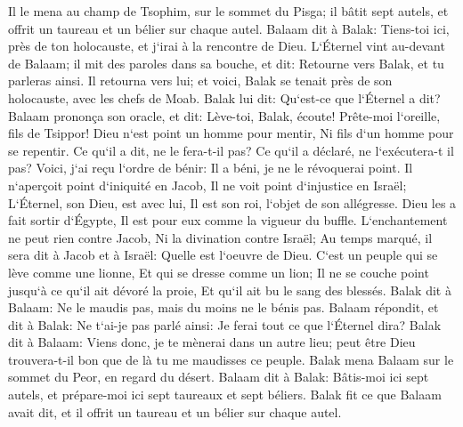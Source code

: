 \verse Il le mena au champ de Tsophim, sur le sommet du Pisga; il bâtit sept autels, et offrit un taureau et un bélier sur chaque autel. 
\verse Balaam dit à Balak: Tiens-toi ici, près de ton holocauste, et j`irai à la rencontre de Dieu. 
\verse L`Éternel vint au-devant de Balaam; il mit des paroles dans sa bouche, et dit: Retourne vers Balak, et tu parleras ainsi. 
\verse Il retourna vers lui; et voici, Balak se tenait près de son holocauste, avec les chefs de Moab. Balak lui dit: Qu`est-ce que l`Éternel a dit? 
\verse Balaam prononça son oracle, et dit: Lève-toi, Balak, écoute! Prête-moi l`oreille, fils de Tsippor! 
\verse Dieu n`est point un homme pour mentir, Ni fils d`un homme pour se repentir. Ce qu`il a dit, ne le fera-t-il pas? Ce qu`il a déclaré, ne l`exécutera-t il pas? 
\verse Voici, j`ai reçu l`ordre de bénir: Il a béni, je ne le révoquerai point. 
\verse Il n`aperçoit point d`iniquité en Jacob, Il ne voit point d`injustice en Israël; L`Éternel, son Dieu, est avec lui, Il est son roi, l`objet de son allégresse. 
\verse Dieu les a fait sortir d`Égypte, Il est pour eux comme la vigueur du buffle. 
\verse L`enchantement ne peut rien contre Jacob, Ni la divination contre Israël; Au temps marqué, il sera dit à Jacob et à Israël: Quelle est l`oeuvre de Dieu. 
\verse C`est un peuple qui se lève comme une lionne, Et qui se dresse comme un lion; Il ne se couche point jusqu`à ce qu`il ait dévoré la proie, Et qu`il ait bu le sang des blessés. 
\verse Balak dit à Balaam: Ne le maudis pas, mais du moins ne le bénis pas. 
\verse Balaam répondit, et dit à Balak: Ne t`ai-je pas parlé ainsi: Je ferai tout ce que l`Éternel dira? 
\verse Balak dit à Balaam: Viens donc, je te mènerai dans un autre lieu; peut être Dieu trouvera-t-il bon que de là tu me maudisses ce peuple. 
\verse Balak mena Balaam sur le sommet du Peor, en regard du désert. 
\verse Balaam dit à Balak: Bâtis-moi ici sept autels, et prépare-moi ici sept taureaux et sept béliers. 
\verse Balak fit ce que Balaam avait dit, et il offrit un taureau et un bélier sur chaque autel. 


